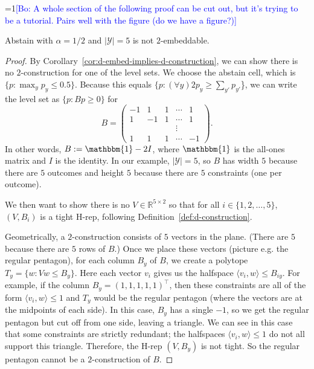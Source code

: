 \documentclass[anon,12pt]{colt2019}
\newcommand{\Comments}{1}
\newcommand{\mynote}[2]{\ifnum\Comments=1\textcolor{#1}{#2}\fi}
\newcommand{\bo}[1]{\mynote{blue}{[Bo: #1]}}
\newcommand{\reals}{\mathbb{R}}
\newcommand{\Y}{\mathcal{Y}}
\newcommand{\inprod}[2]{\langle #1, #2 \rangle}%
\newcommand{\ones}{\mathbbm{1}}
\begin{document}
\bo{A whole section of the following proof can be cut out, but it's trying to be a tutorial. Pairs well with the figure (do we have a figure?)}
\begin{theorem}\label{thm:abs-5outcome-not-2embed}
  Abstain with $\alpha=1/2$ and $|\Y|=5$ is not $2$-embeddable.
\end{theorem}
\begin{proof}
By Corollary~\ref{cor:d-embed-implies-d-construction}, we can show there is no $2$-construction for one of the level sets.
We choose the abstain cell, which is $\{p : \max_y p_y \leq 0.5\}$.
Because this equals $\{p : (\forall y) 2p_y \geq \sum_{y'} p_{y'}$\}, we can write the level set as $\{p : Bp \geq 0\}$ for
  \[ B = \begin{pmatrix}
       -1 &  1 &  1 & \cdots & 1  \\
       1  & -1 &  1 & \cdots & 1  \\
          &    &    & \vdots &    \\
       1  &  1 &  1 & \cdots & -1
     \end{pmatrix} .
  \]
In other words, $B := \ones - 2I$, where $\ones$ is the all-ones matrix and $I$ is the identity.
In our example, $|\Y| = 5$, so $B$ has width $5$ because there are $5$ outcomes and height $5$ because there are $5$ constraints (one per outcome).

We then want to show there is no $V\in \reals^{5\times 2}$ so that for all $i \in \{1, 2, \ldots, 5\}$, $(V, B_i)$ is a tight H-rep, following Definition~\ref{def:d-construction}.

Geometrically, a $2$-construction consists of $5$ vectors in the plane. (There are $5$ because there are $5$ rows of $B$.)
Once we place these vectors (picture e.g. the regular pentagon), for each column $B_y$ of $B$, we create a polytope $T_y = \{w : Vw \leq B_y\}$.
Here each vector $v_i$ gives us the halfspace $\inprod{v_i}{w} \leq B_{iy}$.
For example, if the column $B_y = (1,1,1,1,1)^{\intercal}$, then these constraints are all of the form $\inprod{v_i}{w} \leq 1$ and $T_y$ would be the regular pentagon (where the vectors are at the midpoints of each side).
In this case, $B_y$ has a single $-1$, so we get the regular pentagon but cut off from one side, leaving a triangle.
We can see in this case that some constraints are strictly redundant; the halfspaces $\inprod{v_i}{w} \leq 1$ do not all support this triangle.
Therefore, the H-rep $(V,B_y)$ is not tight.
So the regular pentagon cannot be a $2$-construction of $B$.


\end{proof}
\end{document}
